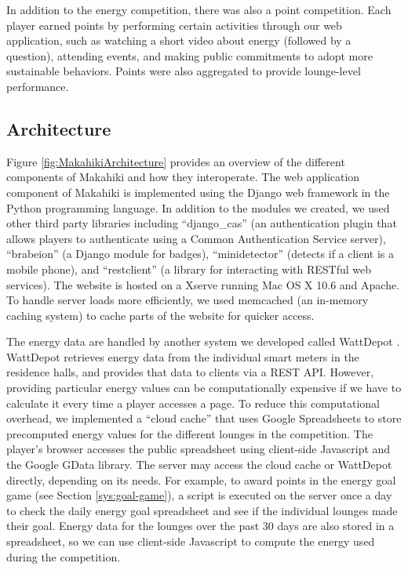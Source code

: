 \documentclass{acm_proc_article-sp}
\begin{document}
In addition to the energy competition, there was also a point competition. Each player earned points by performing certain activities through our web application, such as watching a short video about energy (followed by a question), attending events, and making public commitments to adopt more sustainable behaviors. Points were also aggregated to provide lounge-level performance.

\subsection{Architecture}
\label{sys:Architecture}

Figure \ref{fig:MakahikiArchitecture} provides an overview of the different components of Makahiki and how they interoperate. The web application component of Makahiki is implemented using the Django web framework in the Python programming language. In addition to the modules we created, we used other third party libraries including ``django\_cas'' (an authentication plugin that allows players to authenticate using a Common Authentication Service server), ``brabeion'' (a Django module for badges), ``minidetector'' (detects if a client is a mobile phone), and ``restclient'' (a library for interacting with RESTful web services). The website is hosted on a Xserve running Mac OS X 10.6 and Apache. To handle server loads more efficiently, we used memcached (an in-memory caching system) to cache parts of the website for quicker access.

The energy data are handled by another system we developed called WattDepot 
\cite{csdl2-10-05}. WattDepot retrieves energy data from the individual smart meters in the residence halls, and provides that data to clients via a REST API. However, providing particular energy values can be computationally expensive if we have to calculate it every time a player accesses a page. To reduce this computational overhead, we implemented a ``cloud cache'' that uses Google Spreadsheets to store precomputed energy values for the different lounges in the competition. The player's browser accesses the public spreadsheet using client-side Javascript and the Google GData library. The server may access the cloud cache or WattDepot directly, depending on its needs. For example, to award points in the energy goal game (see Section \ref{sys:goal-game}), a script is executed on the server once a day to check the daily energy goal spreadsheet and see if the individual lounges made their goal. Energy data for the lounges over the past 30 days are also stored in a spreadsheet, so we can use client-side Javascript to compute the energy used during the competition.
\end{document}
